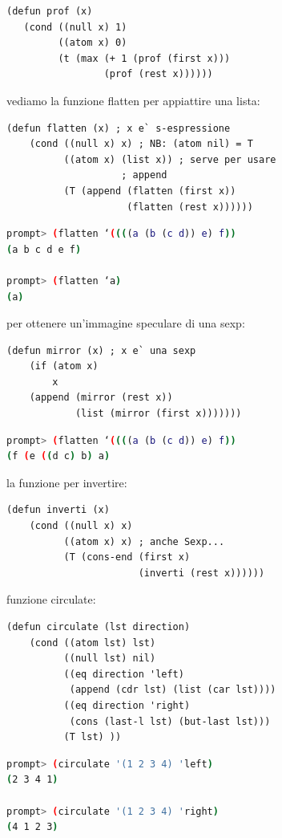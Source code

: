 \documentclass[a4paper,12pt, oneside]{book}
\begin{document}
\begin{verbatim}
(defun prof (x)
   (cond ((null x) 1)
         ((atom x) 0)
         (t (max (+ 1 (prof (first x)))
                 (prof (rest x))))))
\end{verbatim}
vediamo la funzione flatten per appiattire una lista:
\begin{verbatim}
(defun flatten (x) ; x e` s-espressione
    (cond ((null x) x) ; NB: (atom nil) = T
          ((atom x) (list x)) ; serve per usare
                    ; append
          (T (append (flatten (first x))
                     (flatten (rest x))))))
\end{verbatim}
\begin{shaded}
\begin{lstlisting}[language=bash]
prompt> (flatten ‘((((a (b (c d)) e) f)) 
(a b c d e f)

prompt> (flatten ‘a) 
(a)
\end{lstlisting}
\end{shaded}
per ottenere un'immagine speculare di una sexp:
\begin{verbatim}
(defun mirror (x) ; x e` una sexp
    (if (atom x)
        x
    (append (mirror (rest x))
            (list (mirror (first x)))))))
\end{verbatim}
\begin{shaded}
\begin{lstlisting}[language=bash]
prompt> (flatten ‘((((a (b (c d)) e) f)) 
(f (e ((d c) b) a)
\end{lstlisting}
\end{shaded}
la funzione per invertire:
\begin{verbatim}
(defun inverti (x)
    (cond ((null x) x)
          ((atom x) x) ; anche Sexp...
          (T (cons-end (first x)
                       (inverti (rest x))))))
\end{verbatim}
funzione circulate:
\begin{verbatim}
(defun circulate (lst direction)
    (cond ((atom lst) lst)
          ((null lst) nil)
          ((eq direction 'left)
           (append (cdr lst) (list (car lst))))
          ((eq direction 'right)
           (cons (last-l lst) (but-last lst)))
          (T lst) ))
\end{verbatim}
\begin{shaded}
\begin{lstlisting}[language=bash]
prompt> (circulate '(1 2 3 4) 'left)
(2 3 4 1)

prompt> (circulate '(1 2 3 4) 'right)
(4 1 2 3)
\end{lstlisting}
\end{shaded}
\end{document}
